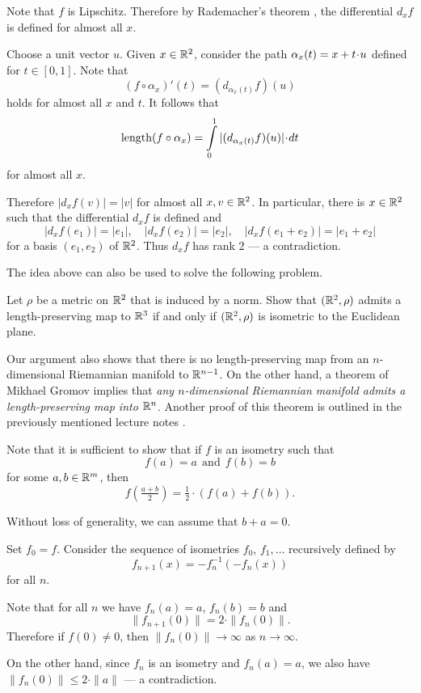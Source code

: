 Note that $f$ is Lipschitz.
Therefore by Rademacher's theorem \cite{rademacher}, the differential $d_xf$ is defined for almost all $x$.

Choose a unit vector $u$.
Given $x\in\mathbb{R}^2$,
consider the path $\alpha_x(t)\z=x+t\cdot u$ defined for $t\in [0,1]$.
Note that
\[(f\circ\alpha_x)'(t)=(d_{\alpha_x(t)}f)(u)\]
holds for almost all $x$ and $t$.
It follows that 
\[\length(f\circ\alpha_x)=\int\limits_0^1 |(d_{\alpha_x(t)}f)(u)| \cdot dt\]
for almost all $x$.

Therefore $|d_xf(v)|=|v|$ for almost all $x,v\in\mathbb{R}^2$.
In particular, there is $x\in\mathbb{R}^2$ such that the differential $d_xf$ is defined 
and 
\[|d_xf(e_1)|=|e_1|,
\quad
|d_xf(e_2)|=|e_2|,
\quad
|d_xf(e_1+e_2)|=|e_1+e_2|\]
for a basis $(e_1,e_2)$ of $\mathbb{R}^2$.
Thus $d_xf$ has rank 2 --- a contradiction.
\qeds

The idea above can also be used to solve the following problem.

\begin{pr} Let $\rho$ be a metric on $\mathbb{R}^2$ that is induced by a norm.
Show that $(\mathbb{R}^2,\rho)$ admits a length-preserving map to $\mathbb{R}^3$ if and only if $(\mathbb{R}^2,\rho)$ is isometric to the Euclidean plane.
\end{pr}

Our argument also shows that there is no length-preserving map from an $n$-dimensional Riemannian manifold to $\mathbb{R}^{n-1}$.
On the other hand, a theorem of Mikhael Gromov \cite[Section~2.4.11]{gromov-PDR} implies that \textit{any $n$-dimensional Riemannian manifold admits a length-preserving map into $\mathbb{R}^n$}.
Another proof of this theorem is outlined in the previously mentioned lecture notes \cite{petrunin-yashinsky}.

Note that it is sufficient to show that if $f$ is an isometry such that
\[f(a)=a\ \ \text{and}\ \ f(b)=b\]
for some $a,b\in\mathbb{R}^m$,
then 
\[f(\tfrac{a+b}2)=\tfrac12\cdot(f(a)+f(b)).\]

Without loss of generality, we can assume that $b+a=0$.

Set $f_0=f$.
Consider the sequence of isometries $f_0$, $f_1,\ldots$ recursively defined by
\[f_{n+1}(x)= -f_n^{-1}(-f_n(x))\]
for all $n$.

Note that for all $n$ we have $f_n(a)=a$, $f_n(b)=b$ and 
$$\|f_{n+1}(0)\|=2\cdot\|f_n(0)\|.$$
Therefore if $f(0)\ne 0$,
then $\|f_n(0)\|\to\infty$ as $n\to\infty$.

On the other hand, since $f_n$ is an isometry and $f_n(a)=a$,
we also have $\|f_n(0)\|\le 2\cdot \|a\|$ --- a contradiction.
\qeds

